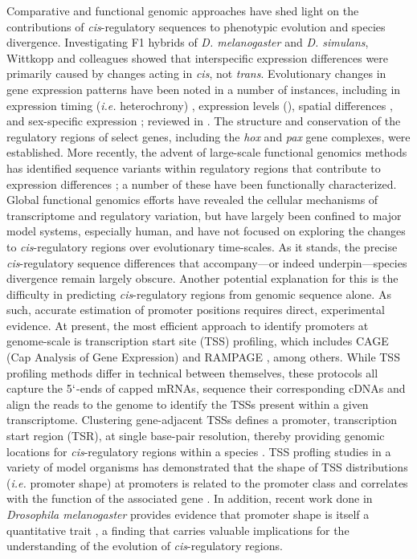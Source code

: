 \documentclass[nogrid]{MBE}%
\begin{document}
Comparative and functional genomic approaches have shed light on the contributions of \textit{cis}-regulatory sequences to phenotypic evolution and species divergence. Investigating F1 hybrids of \textit{D. melanogaster} and \textit{D. simulans}, Wittkopp and colleagues \citep{Wittkopp:2004cy} showed that interspecific expression differences were primarily caused by changes acting in \textit{cis}, not \textit{trans}. Evolutionary changes in gene expression patterns have been noted in a number of instances, including in expression timing (\textit{i.e.} heterochrony) \citep{Wray:1989ku}, expression levels (\citep{Crawford:1999ic}), spatial differences \citep{Abzhanov:2000vb}, and sex-specific expression \citep{Kopp:2000bl}; reviewed in \citep{Wray:2003kn}. The structure and conservation of the regulatory regions of select genes, including the \textit{hox} \citep{Kmita:2002hg} and \textit{pax} \citep{Plaza:1999kc} gene complexes, were established. More recently, the advent of large-scale functional genomics methods has identified sequence variants within regulatory regions that contribute to expression differences \citep{Lappalainen:2013el,Pickrell:2010bq, Schor:2017fw}; a number of these have been functionally characterized. Global functional genomics efforts have revealed the cellular mechanisms of transcriptome and regulatory variation, but have largely been confined to major model systems, especially human, and have not focused on exploring the changes to \textit{cis}-regulatory regions over evolutionary time-scales. As it stands, the precise \textit{cis}-regulatory sequence differences that accompany---or indeed underpin---species divergence remain largely obscure. Another potential explanation for this is the difficulty in predicting \textit{cis}-regulatory regions from genomic sequence alone. As such, accurate estimation of promoter positions requires direct, experimental evidence. At present, the most efficient approach to identify promoters at genome-scale is transcription start site (TSS) profiling, which includes CAGE (Cap Analysis of Gene Expression) \citep{Murata:2014gpb} and RAMPAGE \citep{Batut:2013fu}, among others. While TSS profiling methods differ in technical between themselves, these protocols all capture the 5$`$-ends of capped mRNAs, sequence their corresponding cDNAs and align the reads to the genome to identify the TSSs present within a given transcriptome. Clustering gene-adjacent TSSs defines a promoter, transcription start region (TSR), at single base-pair resolution, thereby providing genomic locations for \textit{cis}-regulatory regions within a species \citep{Lenhard:2012ena,Rach:2009ct}. TSS profling studies in a variety of model organisms has demonstrated that the shape of TSS distributions (\textit{i.e.} promoter shape) at promoters is related to the promoter class and correlates with the function of the associated gene \citep{Carninci:2006in, Rach:2009ct,Hoskins:2011io,Raborn:2016cr}. In addition, recent work done in \textit{Drosophila melanogaster} provides evidence that promoter shape is itself a quantitative trait \citep{Schor:2017fw}, a finding that carries valuable implications for the understanding of the evolution of \textit{cis}-regulatory regions. \\
\end{document}

